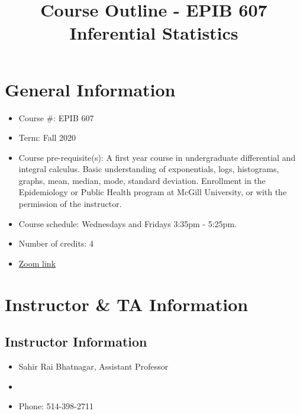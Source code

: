 \documentclass[]{article}
\title{Course Outline - EPIB 607 Inferential Statistics}
\date{}
\begin{document}
\maketitle

\section{General Information}

\begin{itemize}
	\item Course \#: EPIB 607
	\item Term: Fall 2020
	\item Course pre-requisite(s): A first year course in undergraduate differential and integral calculus. Basic understanding of exponentials, logs, histograms, graphs, mean, median, mode, standard deviation. Enrollment in the Epidemiology or Public Health program at McGill University, or with the permission of the instructor.
	\item Course schedule: Wednesdays and Fridays 3:35pm - 5:25pm. 
	\item Number of credits: 4
	\item \href{https://mcgill.zoom.us/meeting/register/tJcucu6qpzgiGdLfhoi4ONLN3FIMP1xyapT2}{Zoom link}
\end{itemize}

\section{Instructor \& TA Information}

\subsection{Instructor Information}
\begin{itemize}
	\item Sahir Rai Bhatnagar, Assistant Professor
	\item \href{mailto:sahir.bhatnagar@mcgill.ca}{\color{blue}{sahir.bhatnagar@mcgill.ca}}
\item Phone: 514-398-2711
\end{itemize}
\end{document}
